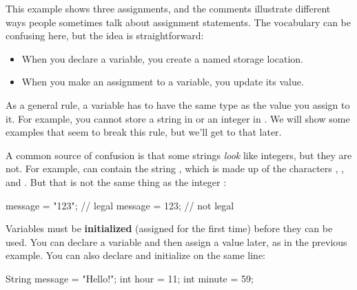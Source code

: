 This example shows three assignments, and the comments illustrate different ways people sometimes talk about assignment statements.
The vocabulary can be confusing here, but the idea is straightforward:

\begin{itemize}
\item When you declare a variable, you create a named storage location.
\item When you make an assignment to a variable, you update its value.
\end{itemize}

As a general rule, a variable has to have the same type as the value you assign to it.
For example, you cannot store a string in  or an integer in .
We will show some examples that seem to break this rule, but we'll get to that later.


A common source of confusion is that some strings {\em look} like integers, but they are not.
For example,  can contain the string , which is made up of the characters , , and .
But that is not the same thing as the integer :

\begin{code}
message = "123";     // legal
message = 123;       // not legal
\end{code}


Variables must be {\bf initialized} (assigned for the first time) before they can be used.
You can declare a variable and then assign a value later, as in the previous example.
You can also declare and initialize on the same line:

\begin{code}
String message = "Hello!";
int hour = 11;
int minute = 59;
\end{code}

%
%
%


